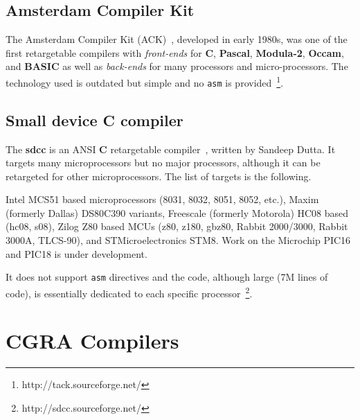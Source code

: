\subsection{Amsterdam Compiler Kit} %

The Amsterdam Compiler Kit ({\sc ACK})~\cite{Tanenbaum:1983}, developed in
early 1980s, was one of the first retargetable compilers with {\it front-ends}
for {\bf C}, {\bf Pascal}, {\bf Modula-2}, {\bf Occam}, and {\bf BASIC} as well
as {\it back-ends} for many processors and micro-processors.
The technology used is outdated but simple and no {\tt asm}
is provided~\footnote{http://tack.sourceforge.net/}.


\subsection{Small device C compiler} %

The {\bf sdcc} is an {\sc ANSI} {\bf C} retargetable
compiler~\cite{sandeep:2000}, written by Sandeep Dutta.
It targets many microprocessors but no major processors, although it can
be retargeted for other microprocessors. The list of targets is the following.

Intel {\sc MCS51} based microprocessors (8031, 8032, 8051, 8052, etc.), Maxim
(formerly Dallas)\linebreak
{\sc DS80C390} variants, Freescale (formerly Motorola) {\sc
  HC08} based (hc08, s08), Zilog Z80 based {\sc MCUs} (z80, z180, gbz80, Rabbit
2000/3000, Rabbit 3000A, {\sc TLCS-90}), and {\sc STMicroelectronics} {\sc
  STM8}. Work on the Microchip {\sc PIC16} and {\sc PIC18} is under development.

It does not support {\tt asm} directives and the code, although large (7M lines
of code), is essentially dedicated to each specific
processor~\footnote{http://sdcc.sourceforge.net/}.

\section{{\sc CGRA} Compilers}

